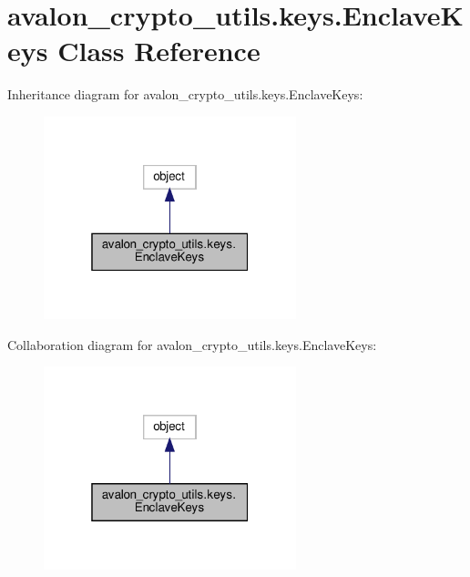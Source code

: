 \hypertarget{classavalon__crypto__utils_1_1keys_1_1EnclaveKeys}{}\section{avalon\+\_\+crypto\+\_\+utils.\+keys.\+Enclave\+Keys Class Reference}
\label{classavalon__crypto__utils_1_1keys_1_1EnclaveKeys}


Inheritance diagram for avalon\+\_\+crypto\+\_\+utils.\+keys.\+Enclave\+Keys\+:
\nopagebreak
\begin{figure}[H]
\begin{center}
\leavevmode
\includegraphics[width=208pt]{classavalon__crypto__utils_1_1keys_1_1EnclaveKeys__inherit__graph}
\end{center}
\end{figure}


Collaboration diagram for avalon\+\_\+crypto\+\_\+utils.\+keys.\+Enclave\+Keys\+:
\nopagebreak
\begin{figure}[H]
\begin{center}
\leavevmode
\includegraphics[width=208pt]{classavalon__crypto__utils_1_1keys_1_1EnclaveKeys__coll__graph}
\end{center}
\end{figure}
